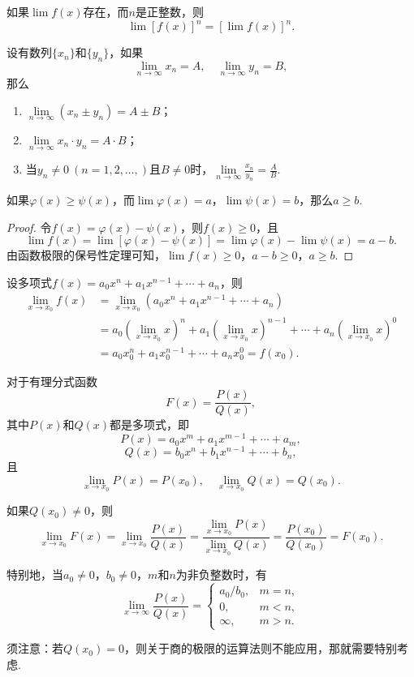 \begin{corollary}
如果\(\lim f(x)\)存在，而\(n\)是正整数，则\[\lim [f(x)]^n = [\lim f(x)]^n.\]
\end{corollary}

\begin{theorem}
设有数列\(\{x_n\}\)和\(\{y_n\}\)，如果\[
\lim\limits_{n\to\infty}x_n = A,
\quad
\lim\limits_{n\to\infty}y_n = B,
\]那么\begin{enumerate}
\item \(\lim\limits_{n\to\infty}{(x_n \pm y_n)}=A \pm B\)；
\item \(\lim\limits_{n\to\infty}{x_n \cdot y_n}=A \cdot B\)；
\item 当\(y_n \neq 0\ (n=1,2,\dotsc,)\)且\(B \neq 0\)时，\(\lim\limits_{n\to\infty}{\frac{x_n}{y_n}}=\frac{A}{B}\).
\end{enumerate}
\end{theorem}

\begin{theorem}
如果\(\varphi(x) \geq \psi(x)\)，而\(\lim \varphi(x)=a\)，\(\lim \psi(x)=b\)，那么\(a \geq b\).
\begin{proof}
令\(f(x) = \varphi(x) - \psi(x)\)，则\(f(x) \geq 0\)，且\[
\lim f(x) = \lim[\varphi(x) - \psi(x)]
= \lim \varphi(x) - \lim \psi(x)
= a - b.
\]由函数极限的保号性定理可知，\(\lim f(x) \geq 0\)，\(a - b \geq 0\)，\(a \geq b\).
\end{proof}
\end{theorem}

\begin{example}
设多项式\(f(x) = a_0 x^n + a_1 x^{n-1} + \dotsb + a_n\)，则\begin{align*}
\lim\limits_{x \to x_0}f(x) &= \lim\limits_{x \to x_0}{(a_0 x^n + a_1 x^{n-1} + \dotsb + a_n)} \\
&= a_0 (\lim\limits_{x \to x_0} x)^n + a_1 (\lim\limits_{x \to x_0} x)^{n-1} + \dotsb + a_n (\lim\limits_{x \to x_0} x)^0 \\
&= a_0 x_0^n + a_1 x_0^{n-1} + \dotsb + a_n x_0^0
= f(x_0).
\end{align*}
\end{example}

\begin{example}
对于有理分式函数\[
F(x) = \frac{P(x)}{Q(x)},
\]其中\(P(x)\)和\(Q(x)\)都是多项式，即\[
P(x) = a_0 x^m + a_1 x^{m-1} + \dotsb + a_m,
\]\[
Q(x) = b_0 x^n + b_1 x^{n-1} + \dotsb + b_n,
\]且\[
\lim\limits_{x \to x_0} P(x) = P(x_0),
\quad
\lim\limits_{x \to x_0} Q(x) = Q(x_0).
\]

如果\(Q(x_0) \neq 0\)，则\[
\lim\limits_{x \to x_0} F(x)
= \lim\limits_{x \to x_0} \frac{P(x)}{Q(x)}
= \frac{\lim\limits_{x \to x_0} P(x)}{\lim\limits_{x \to x_0} Q(x)}
= \frac{P(x_0)}{Q(x_0)}
= F(x_0).
\]

特别地，当\(a_0\neq0\)，\(b_0\neq0\)，\(m\)和\(n\)为非负整数时，有
\[
\lim\limits_{x\to\infty}\frac{P(x)}{Q(x)} = \left\{ \begin{array}{cl}
a_0/b_0, & m=n, \\
0, & m<n, \\
\infty, & m>n.
\end{array} \right.
\]
\end{example}
须注意：若\(Q(x_0) = 0\)，则关于商的极限的运算法则不能应用，那就需要特别考虑.

